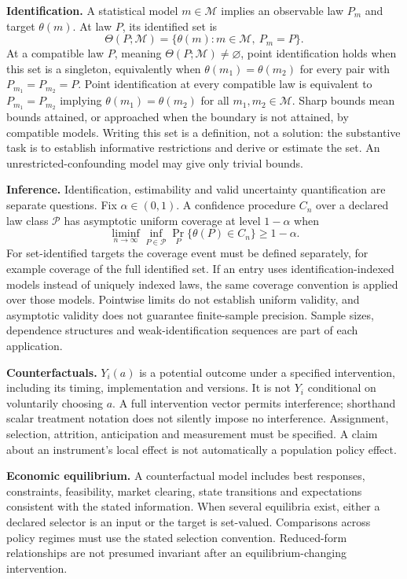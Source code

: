 \documentclass[11pt,a4paper]{article}
\begin{document}
\textbf{Identification.} A statistical model $m\in\mathcal M$ implies an observable law $P_m$ and target $\theta(m)$. At law $P$, its identified set is
\[
\Theta(P;\mathcal M)=\{\theta(m):m\in\mathcal M,\ P_m=P\}.
\]
At a compatible law $P$, meaning $\Theta(P;\mathcal M)\ne\varnothing$, point identification holds when this set is a singleton, equivalently when $\theta(m_1)=\theta(m_2)$ for every pair with $P_{m_1}=P_{m_2}=P$. Point identification at every compatible law is equivalent to $P_{m_1}=P_{m_2}$ implying $\theta(m_1)=\theta(m_2)$ for all $m_1,m_2\in\mathcal M$. Sharp bounds mean bounds attained, or approached when the boundary is not attained, by compatible models. Writing this set is a definition, not a solution: the substantive task is to establish informative restrictions and derive or estimate the set. An unrestricted-confounding model may give only trivial bounds.

\textbf{Inference.} Identification, estimability and valid uncertainty quantification are separate questions. Fix $\alpha\in(0,1)$. A confidence procedure $C_n$ over a declared law class $\mathcal P$ has asymptotic uniform coverage at level $1-\alpha$ when
\[
\liminf_{n\to\infty}\inf_{P\in\mathcal P}\Pr_P\{\theta(P)\in C_n\}\geq1-\alpha.
\]
For set-identified targets the coverage event must be defined separately, for example coverage of the full identified set. If an entry uses identification-indexed models instead of uniquely indexed laws, the same coverage convention is applied over those models. Pointwise limits do not establish uniform validity, and asymptotic validity does not guarantee finite-sample precision. Sample sizes, dependence structures and weak-identification sequences are part of each application.

\textbf{Counterfactuals.} $Y_i(a)$ is a potential outcome under a specified intervention, including its timing, implementation and versions. It is not $Y_i$ conditional on voluntarily choosing $a$. A full intervention vector permits interference; shorthand scalar treatment notation does not silently impose no interference. Assignment, selection, attrition, anticipation and measurement must be specified. A claim about an instrument's local effect is not automatically a population policy effect.

\textbf{Economic equilibrium.} A counterfactual model includes best responses, constraints, feasibility, market clearing, state transitions and expectations consistent with the stated information. When several equilibria exist, either a declared selector is an input or the target is set-valued. Comparisons across policy regimes must use the stated selection convention. Reduced-form relationships are not presumed invariant after an equilibrium-changing intervention.
\end{document}

